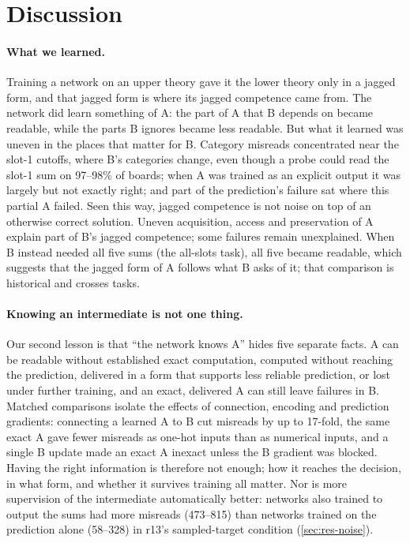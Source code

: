 \section{Discussion}\label{sec:discussion}

\paragraph{What we learned.} Training a network on an upper theory gave it
the lower theory only in a jagged form, and that jagged form is where its
jagged competence came from. The network did learn something of A: the part
of A that B depends on became readable, while the parts B ignores became less
readable. But
what it learned was uneven in the places that matter for B. Category misreads
concentrated near the slot-1 cutoffs, where B's categories change, even
though a probe could read the slot-1 sum on 97--98\% of boards;
when A was trained as an explicit output it was largely but not exactly
right; and part of the prediction's failure sat where this partial A failed.
Seen this way, jagged competence is not noise on top of an otherwise correct
solution. Uneven acquisition, access and preservation of A explain part of
B's jagged competence; some failures remain unexplained. When B instead needed all five sums
(the all-slots task), all five became readable, which suggests that the
jagged form of A follows what B asks of it; that comparison is historical
and crosses tasks.

\paragraph{Knowing an intermediate is not one thing.} Our second lesson is
that ``the network knows A'' hides five separate facts. A can be readable
without established exact computation, computed without reaching the
prediction, delivered in a form that supports less reliable prediction, or
lost under further training, and an exact, delivered A can still leave
failures in B. Matched comparisons isolate the effects of connection,
encoding and prediction gradients: connecting a learned A to B cut misreads
by up to 17-fold, the same exact A gave fewer misreads as one-hot inputs
than as numerical inputs, and a single B update made an exact A inexact unless the
B gradient was blocked. Having the right information is therefore not enough;
how it reaches the decision, in what form, and whether it survives training
all matter. Nor is more supervision of the intermediate automatically
better: networks also trained to output the sums had more misreads (473--815)
than networks trained on the prediction alone (58--328) in r13's
sampled-target condition (\cref{sec:res-noise}).

